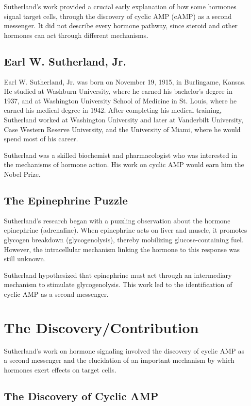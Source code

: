 Sutherland's work provided a crucial early explanation of how some hormones signal target cells, through the discovery of cyclic AMP (cAMP) as a second messenger. It did not describe every hormone pathway, since steroid and other hormones can act through different mechanisms.

\subsection{Earl W. Sutherland, Jr.}

Earl W. Sutherland, Jr. was born on November 19, 1915, in Burlingame, Kansas. He studied at Washburn University, where he earned his bachelor's degree in 1937, and at Washington University School of Medicine in St. Louis, where he earned his medical degree in 1942. After completing his medical training, Sutherland worked at Washington University and later at Vanderbilt University, Case Western Reserve University, and the University of Miami, where he would spend most of his career.

Sutherland was a skilled biochemist and pharmacologist who was interested in the mechanisms of hormone action. His work on cyclic AMP would earn him the Nobel Prize.

\subsection{The Epinephrine Puzzle}

Sutherland's research began with a puzzling observation about the hormone epinephrine (adrenaline). When epinephrine acts on liver and muscle, it promotes glycogen breakdown (glycogenolysis), thereby mobilizing glucose-containing fuel. However, the intracellular mechanism linking the hormone to this response was still unknown.

Sutherland hypothesized that epinephrine must act through an intermediary mechanism to stimulate glycogenolysis. This work led to the identification of cyclic AMP as a second messenger.

\section{The Discovery/Contribution}

Sutherland's work on hormone signaling involved the discovery of cyclic AMP as a second messenger and the elucidation of an important mechanism by which hormones exert effects on target cells.

\subsection{The Discovery of Cyclic AMP}

